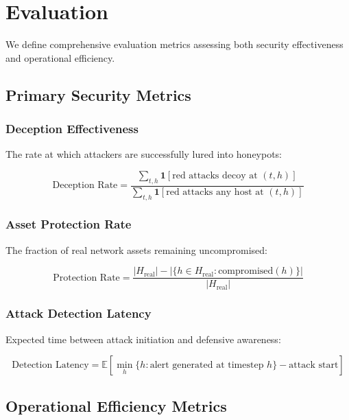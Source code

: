 \documentclass[11pt]{article}
\theoremstyle{definition}
\theoremstyle{plain}
\newcommand{\EE}{\mathbb{E}}
\begin{document}
\section{Evaluation}

We define comprehensive evaluation metrics assessing both security effectiveness and operational efficiency.

\subsection{Primary Security Metrics}

\subsubsection{Deception Effectiveness}
The rate at which attackers are successfully lured into honeypots:

\begin{equation}
\text{Deception Rate} = \frac{\sum_{t,h} \mathbf{1}[\text{red attacks decoy at } (t,h)]}{\sum_{t,h} \mathbf{1}[\text{red attacks any host at } (t,h)]}
\end{equation}

\subsubsection{Asset Protection Rate}
The fraction of real network assets remaining uncompromised:

\begin{equation}
\text{Protection Rate} = \frac{|H_{\text{real}}| - |\{h \in H_{\text{real}} : \text{compromised}(h)\}|}{|H_{\text{real}}|}
\end{equation}

\subsubsection{Attack Detection Latency}
Expected time between attack initiation and defensive awareness:

\begin{equation}
\text{Detection Latency} = \EE\left[\min_h \{h : \text{alert generated at timestep } h\} - \text{attack start}\right]
\end{equation}

\subsection{Operational Efficiency Metrics}
\end{document}
